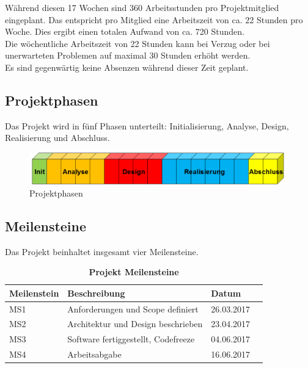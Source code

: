 \noindent Während diesen 17 Wochen sind 360 Arbeitsstunden pro Projektmitglied eingeplant. Das entspricht pro Mitglied eine Arbeitszeit von ca. 22 Stunden pro Woche. Dies ergibt einen totalen Aufwand von ca. 720 Stunden.\\

\noindent Die wöchentliche Arbeitszeit von 22 Stunden kann bei Verzug oder bei unerwarteten Problemen auf maximal 30 Stunden erhöht werden. \\

\noindent Es sind gegenwärtig keine Absenzen während dieser Zeit geplant.

\subsection{Projektphasen}
Das Projekt wird in fünf Phasen unterteilt: Initialisierung, Analyse, Design, Realisierung und Abschluss.
\newline
\begin{figure}[H]
\centering
\includegraphics[width=1\textwidth]{../01_Projektplanung/images/phasen.png}
\caption{Projektphasen}
\end{figure}
\subsection{Meilensteine}
Das Projekt beinhaltet insgesamt vier Meilensteine. \\
\begin{table}[H]
    \begin{tabular}{@{} l l l r@{}}\toprule    
    {Meilenstein} & {Beschreibung} & {Datum}\\ \midrule
    MS1 & Anforderungen und Scope definiert  & 26.03.2017\\ \addlinespace
    MS2 & Architektur und Design beschrieben & 23.04.2017\\ \addlinespace
    MS3 & Software fertiggestellt, Codefreeze  & 04.06.2017\\ \addlinespace
    MS4 & Arbeitsabgabe & 16.06.2017\\ 
    \bottomrule
    \end{tabular}
\caption{\textbf{Projekt Meilensteine}}
\end{table}
\newpage
